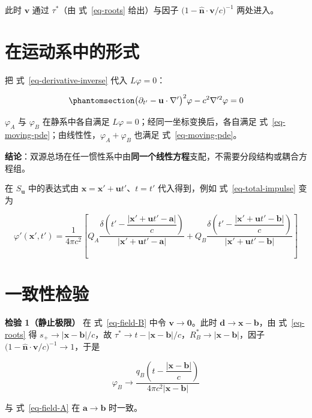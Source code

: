 \documentclass[
  chinese,
  a4paper,
  UTF8,
  12pt,
  oneside,
  openany]{ctexbook}
\theoremstyle{plain}
\theoremstyle{plain}
\theoremstyle{plain}
\theoremstyle{definition}
\theoremstyle{plain}
\theoremstyle{plain}
\theoremstyle{remark}
\begin{document}
此时 \(\mathbf{v}\) 通过 \(\tau^{*}\)（由 式~\ref{eq-roots} 给出）与因子
\(\bigl(1-\hat{\mathbf{n}}\cdot\mathbf{v}/c\bigr)^{-1}\) 两处进入。

\section{在运动系中的形式}\label{sec-tsf-moving-frame}

把 式~\ref{eq-derivative-inverse} 代入 \(L\varphi=0\)：

\begin{equation}\protect\phantomsection\label{eq-moving-pde}{
\bigl(\partial_{t'}-\mathbf{u}\cdot\nabla'\bigr)^{2}\varphi-c^{2}\nabla'^{2}\varphi=0
}\end{equation}

\(\varphi_{A}\) 与 \(\varphi_{B}\) 在静系中各自满足
\(L\varphi=0\)；经同一坐标变换后，各自满足
式~\ref{eq-moving-pde}；由线性性，\(\varphi_{A}+\varphi_{B}\) 也满足
式~\ref{eq-moving-pde}。

\textbf{结论}：双源总场在任一惯性系中由\textbf{同一个线性方程}支配，不需要分段结构或耦合方程组。

在 \(S_{\mathbf{u}}\) 中的表达式由
\(\mathbf{x}=\mathbf{x}'+\mathbf{u}t'\)、\(t=t'\) 代入得到，例如
式~\ref{eq-total-impulse} 变为

\[
\varphi'(\mathbf{x}',t')=\frac{1}{4\pi c^{2}}\left[
Q_{A}\frac{\delta\!\left(t'-\dfrac{|\mathbf{x}'+\mathbf{u}t'-\mathbf{a}|}{c}\right)}{|\mathbf{x}'+\mathbf{u}t'-\mathbf{a}|}
+Q_{B}\frac{\delta\!\left(t'-\dfrac{|\mathbf{x}'+\mathbf{u}t'-\mathbf{b}|}{c}\right)}{|\mathbf{x}'+\mathbf{u}t'-\mathbf{b}|}
\right]
\]

\section{一致性检验}\label{sec-tsf-checks}

\textbf{检验 1（静止极限）} 在 式~\ref{eq-field-B} 中令
\(\mathbf{v}\to\mathbf{0}\)。此时
\(\mathbf{d}\to\mathbf{x}-\mathbf{b}\)，由 式~\ref{eq-roots} 得
\(s_{+}\to|\mathbf{x}-\mathbf{b}|/c\)，故
\(\tau^{*}\to t-|\mathbf{x}-\mathbf{b}|/c\)，\(R_{B}^{*}\to|\mathbf{x}-\mathbf{b}|\)，因子
\(\bigl(1-\hat{\mathbf{n}}\cdot\mathbf{v}/c\bigr)^{-1}\to 1\)，于是

\[
\varphi_{B}\longrightarrow\frac{q_{B}\!\left(t-\dfrac{|\mathbf{x}-\mathbf{b}|}{c}\right)}{4\pi c^{2}|\mathbf{x}-\mathbf{b}|}
\]

与 式~\ref{eq-field-A} 在 \(\mathbf{a}\to\mathbf{b}\) 时一致。
\end{document}
